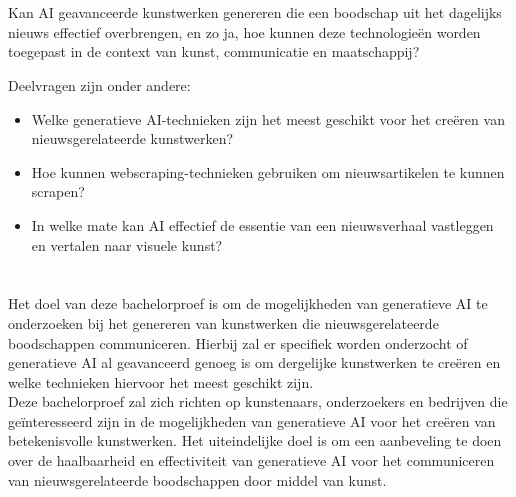 \section{}%
\label{sec:onderzoeksvraag}

\noindent
Kan AI geavanceerde kunstwerken genereren die een boodschap uit het dagelijks nieuws effectief overbrengen, en zo ja, hoe kunnen deze technologieën worden toegepast in de context van kunst, communicatie en maatschappij?

Deelvragen zijn onder andere:

\begin{itemize}
    \item Welke generatieve AI-technieken zijn het meest geschikt voor het creëren van nieuwsgerelateerde kunstwerken?
    \item Hoe kunnen webscraping-technieken gebruiken om nieuwsartikelen te kunnen scrapen?
    \item In welke mate kan AI effectief de essentie van een nieuwsverhaal vastleggen en vertalen naar visuele kunst?
\end{itemize}

\pagebreak

\section{}%
\label{sec:onderzoeksdoelstelling}

\noindent
Het doel van deze bachelorproef is om de mogelijkheden van generatieve AI te onderzoeken bij het genereren van kunstwerken die nieuwsgerelateerde boodschappen communiceren. Hierbij zal er specifiek worden onderzocht of generatieve AI al geavanceerd genoeg is om dergelijke kunstwerken te creëren en welke technieken hiervoor het meest geschikt zijn.  \\

Deze bachelorproef zal zich richten op kunstenaars, onderzoekers en bedrijven die geïnteresseerd zijn in de mogelijkheden van generatieve AI voor het creëren van betekenisvolle kunstwerken. Het uiteindelijke doel is om een aanbeveling te doen over de haalbaarheid en effectiviteit van generatieve AI voor het communiceren van nieuwsgerelateerde boodschappen door middel van kunst.

\section{}%
\label{sec:opzet-bachelorproef}

